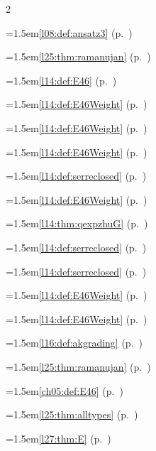 \begin{multicols}{2}
\par{}\par\nopagebreak\smallskip
\hangindent=1.5em\quad \ref{l08:def:ansatz3} (p.~\pageref{l08:def:ansatz3})\par
\hangindent=1.5em\quad \ref{l25:thm:ramanujan} (p.~\pageref{l25:thm:ramanujan})\par
\hangindent=1.5em\quad \ref{l14:def:E46} (p.~\pageref{l14:def:E46})\par
\hangindent=1.5em\quad \ref{l14:def:E46Weight} (p.~\pageref{l14:def:E46Weight})\par
\hangindent=1.5em\quad \ref{l14:def:E46Weight} (p.~\pageref{l14:def:E46Weight})\par
\hangindent=1.5em\quad \ref{l14:def:E46Weight} (p.~\pageref{l14:def:E46Weight})\par
\hangindent=1.5em\quad \ref{l14:def:serreclosed} (p.~\pageref{l14:def:serreclosed})\par
\hangindent=1.5em\quad \ref{l14:def:E46Weight} (p.~\pageref{l14:def:E46Weight})\par
\hangindent=1.5em\quad \ref{l14:thm:qexpzhuG} (p.~\pageref{l14:thm:qexpzhuG})\par
\hangindent=1.5em\quad \ref{l14:def:serreclosed} (p.~\pageref{l14:def:serreclosed})\par
\hangindent=1.5em\quad \ref{l14:def:serreclosed} (p.~\pageref{l14:def:serreclosed})\par
\hangindent=1.5em\quad \ref{l14:def:E46Weight} (p.~\pageref{l14:def:E46Weight})\par
\hangindent=1.5em\quad \ref{l14:def:E46Weight} (p.~\pageref{l14:def:E46Weight})\par
\hangindent=1.5em\quad \ref{l16:def:akgrading} (p.~\pageref{l16:def:akgrading})\par
\hangindent=1.5em\quad \ref{l25:thm:ramanujan} (p.~\pageref{l25:thm:ramanujan})\par
\hangindent=1.5em\quad \ref{ch05:def:E46} (p.~\pageref{ch05:def:E46})\par
\hangindent=1.5em\quad \ref{l25:thm:alltypes} (p.~\pageref{l25:thm:alltypes})\par
\hangindent=1.5em\quad \ref{l27:thm:E} (p.~\pageref{l27:thm:E})\par

\end{multicols}
